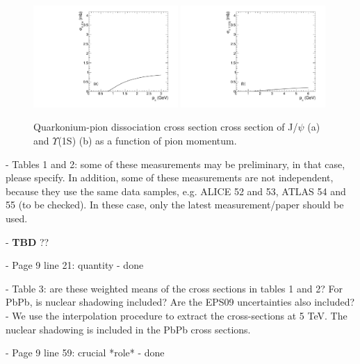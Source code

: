 \documentclass[a4paper,11pt]{article}
\begin{document}
\begin{figure}
\includegraphics[width=0.49\textwidth]{Fig_JPsi_SigmaD_Pion.pdf}
\includegraphics[width=0.49\textwidth]{Fig_Y1S_SigmaD_Pion.pdf}
\caption{Quarkonium-pion dissociation cross section cross section of J/$\psi$ (a) and $\Upsilon$(1S) (b) as a function of
pion momentum.}
\label{fig:SigmaDPi}
\end{figure}

- Tables 1 and 2: some of these measurements may be preliminary, in that case, please specify. In addition, some of these
measurements are not independent, because they use the same data samples, e.g. ALICE 52 and 53, ATLAS 54 and 55 (to be checked).
In these case, only the latest measurement/paper should be used. \newline

- {\color{red} \textbf{TBD} ??}\newline


- Page 9 line 21: quantity \newline
- {\color{blue} done}\newline

- Table 3: are these weighted means of the cross sections in tables 1 and 2? For PbPb, is nuclear shadowing included? Are the EPS09
uncertainties also included? \newline
- {\color{blue} We use the interpolation procedure to extract the cross-sections at 5 TeV. The nuclear shadowing is included in the
PbPb cross sections.}\newline

- Page 9 line 59: crucial *role* \newline
- {\color{blue} done}\newline
\end{document}
